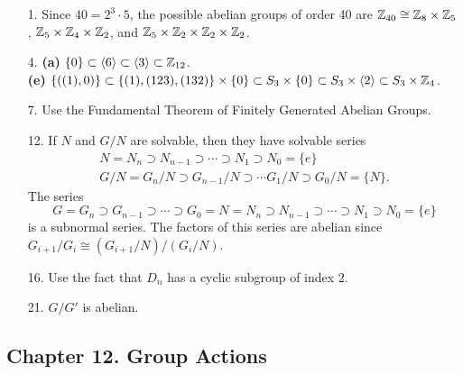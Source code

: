 {\small
\begin{itemize}
 
\bf\item[1.]\rm 
Since $40 = 2^3 \cdot 5$, the possible abelian groups of order 40 are 
${\Bbb Z}_{40} \cong {\Bbb Z}_{8} \times {\Bbb Z}_{5}$, 
${\Bbb Z}_{5} \times {\Bbb Z}_{4} \times {\Bbb Z}_{2}$, and
${\Bbb Z}_{5} \times {\Bbb Z}_{2} \times {\Bbb Z}_{2} \times {\Bbb
Z}_{2}$. 
 
\bf\item[4.]\rm 
{\bf (a)} $\{ 0 \} \subset \langle 6 \rangle \subset \langle 3
\rangle \subset {\Bbb Z}_{12}$. \\
{\bf (e)} 
$\{ ((1), 0)  \} \subset \{ (1), (123), (132) \} \times \{ 0 \}  
\subset S_3 \times \{ 0 \}  \subset 
S_3 \times \langle 2 \rangle \subset S_3 \times {\Bbb Z}_4$.
 
\bf\item[7.]\rm
Use the Fundamental Theorem of Finitely Generated Abelian Groups.
 
\bf\item[12.]\rm
If $N$ and $G/N$ are solvable, then they have solvable series
\[
\begin{array}{c}
N = N_n \supset N_{n-1} \supset \cdots \supset N_1 \supset N_0 
= \{ e \}  \\
G/N = G_n/N \supset G_{n-1}/N \supset \cdots G_1/N \supset G_0/N 
= \{ N \}.
\end{array}
\]
The series
\[
G = G_n \supset G_{n-1}	\supset \cdots \supset G_0 = N = N_n \supset
N_{n-1} \supset \cdots \supset N_1 \supset N_0 = \{ e \} 
\]
is a subnormal series. The factors of this series are abelian since
$G_{i+1}/G_i \cong (G_{i+1}/N)/(G_i/N)$.
 
\bf\item[16.]\rm
Use the fact that $D_n$ has a cyclic subgroup of index 2.
 
\bf\item[21.]\rm
$G/G'$ is abelian.
 
 
\end{itemize}
}
 
\subsection*{Chapter 12. Group Actions}
 
